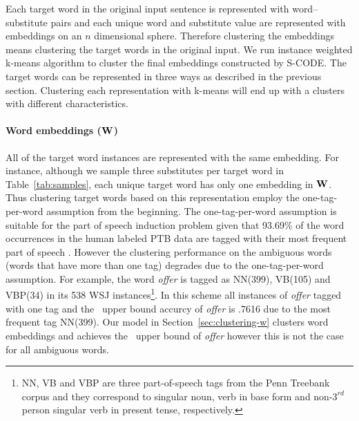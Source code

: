 Each target word in the original input sentence is represented with
word--substitute pairs and each unique word and substitute value are
represented with embeddings on an $n$ dimensional sphere.  Therefore
clustering the embeddings means clustering the target words in the
original input.  We run instance weighted k-means algorithm to cluster
the final embeddings constructed by S-CODE.  The target words can be
represented in three ways as described in the previous section.
Clustering each representation with k-means will end up with a
clusters with different characteristics.

\paragraph{Word embeddings (${\bf W}$)} All of the target word
instances are represented with the same embedding.  For instance,
although we sample three substitutes per target word in
Table~\ref{tab:samples}, each unique target word has only one
embedding in ${\bf W}$.  Thus clustering target words based on this
representation employ the one-tag-per-word assumption from the
beginning.  The one-tag-per-word assumption is suitable for the part
of speech induction problem given that 93.69\% of the word occurrences
in the human labeled PTB data are tagged with their most frequent part
of speech \cite{Toutanova:2003:FPT:1073445.1073478}.  However the
clustering performance on the ambiguous words (words that have more
than one tag) degrades due to the one-tag-per-word assumption.  For
example, the word {\it offer} is tagged as NN(399), VB(105) and
VBP(34) in its 538 WSJ instances\footnote{NN, VB and VBP are three
  part-of-speech tags from the Penn Treebank corpus and they
  correspond to singular noun, verb in base form and
  non-$3^{rd}$person singular verb in present tense, respectively.}.
In this scheme all instances of {\it offer} tagged with one tag
and the \mto\ upper bound accurcy of {\it offer} is .7616 due to
the most frequent tag NN(399). Our model in
Section~\ref{sec:clustering-w} clusters word embeddings and achieves
the \mto\ upper bound of {\it offer} however this is not the case
for all ambiguous words.

